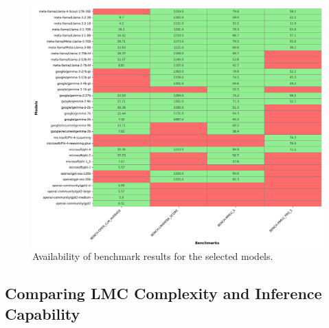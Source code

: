         \begin{figure}[H]
            \includegraphics[width=\linewidth]{img/benchmark_availability.png}
            \caption{Availability of benchmark results for the selected models.}
            \label{fig:benchmark_availability}
        \end{figure}

\subsection{Comparing LMC Complexity and Inference Capability}


